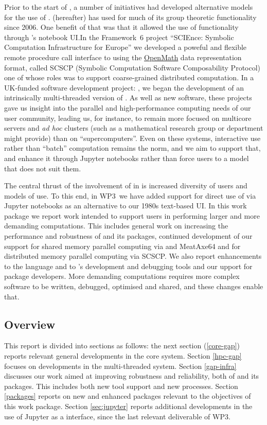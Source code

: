 \documentclass{deliverablereport}
\begin{document}
Prior to the start of \ODK, a number of initiatives had developed
alternative models for the use of \GAP. \SageMath (\Sage hereafter)
has used \GAP for much of its group theoretic functionality since
2006. One benefit of that was that it allowed the use of \GAP
functionality through \Sage's notebook UI.In the Framework~6 project
``SCIEnce: Symbolic Computation Infrastructure for Europe'' we
developed a poweful and flexible remote procedure call interface to
\GAP using the \href{??}{OpenMath} data representation format, called
SCSCP (Symbolic Computation Software Composability Protocol) one of
whose roles was to support coarse-grained distributed computation. In
a UK-funded software development project: \HPCGAP, we began the
development of an intrinsically multi-threaded version of \GAP. As
well as new software, these projects gave us insight into the parallel
and high-performance computing needs of our user community, leading
us, for instance, to remain more focused on multicore servers and
\textit{ad hoc} clusters (such as a mathematical research group or
department might provide) than on ``supercomputers''. Even on these
systems, interactive use rather than ``batch'' computation remains the
norm, and we aim to support that, and enhance it through Jupyter
notebooks rather than force users to a model that does not suit them.

The central thrust of the involvement of \GAP in \ODK is increased
diversity of users and models of use. To this end, in WP3~we have
added support for direct use of \GAP via Jupyter notebooks as an
alternative to our 1980s text-based UI. In this work package we report
work intended to support \GAP users in performing larger and more
demanding computations. This includes general work on increasing the
performance and robustness of \GAP and its packages, continued
development of our support for shared memory parallel computing via
\HPCGAP and MeatAxe64 and for distributed memory parallel computing
via SCSCP. We also report enhancements to the \GAP language and to
\GAP's development and debugging tools and our upport for package
developers. More demanding computations requires more complex software
to be written, debugged, optimised and shared, and these changes
enable that.

\subsection{Overview}
This report is divided into sections as follows: the next section (\ref{core-gap})
reports relevant general developments in the core \GAP system. Section
\ref{hpc-gap} focuses on developments in the multi-threaded
system. Section \ref{gap-infra} discusses our work aimed at improving
robustness and reliability, both of \GAP and its packages. This
includes both new tool support and new processes. Section
\ref{packages} reports on new and enhanced packages relevant to the
objectives of this work package.  Section \ref{sec:jupyter} reports
additional developments in the use of Jupyter as a \GAP interface,
since the last relevant deliverable of WP3.
\end{document}
